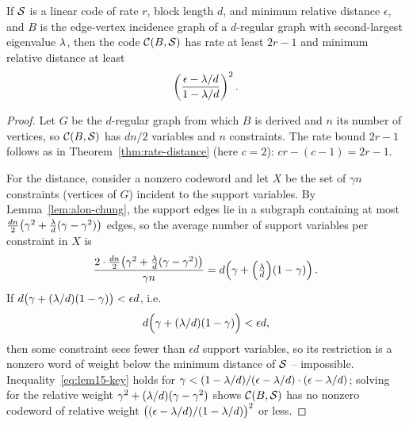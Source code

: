 \begin{lemma}
  \label{lem:distance-eigenvalue}
  If $\mathcal{S}$ is a linear code of rate $r$, block length $d$, and minimum relative
  distance $\epsilon$, and $B$ is the edge-vertex incidence graph of a
  $d$-regular graph with second-largest eigenvalue $\lambda$, then the code
  $\mathcal{C}(B,\mathcal{S})$ has rate at least $2r-1$ and minimum relative distance at least
  \[
    \left(\frac{\epsilon-\lambda/d}{1-\lambda/d}\right)^2.
  \]
\end{lemma}
\begin{proof}
  Let $G$ be the $d$-regular graph from which $B$ is derived and $n$ its number
  of vertices, so $\mathcal{C}(B,\mathcal{S})$ has $dn/2$ variables and $n$ constraints. The
  rate bound $2r-1$ follows as in Theorem~\ref{thm:rate-distance} (here $c=2$):
  $cr-(c-1)=2r-1$.

  For the distance, consider a nonzero codeword and let $X$ be the set of
  $\gamma n$ constraints (vertices of $G$) incident to the support variables. By
  Lemma~\ref{lem:alon-chung}, the support edges lie in a subgraph containing at
  most $\tfrac{dn}{2}\bigl(\gamma^2 + \tfrac{\lambda}{d}(\gamma-\gamma^2)\bigr)$
  edges, so the average number of support variables per constraint in $X$ is
  \[
    \frac{2\cdot\frac{dn}{2}\bigl(\gamma^2+\frac{\lambda}{d}(\gamma-\gamma^2)\bigr)}
         {\gamma n}
    = d\!\left(\gamma + \Bigl(\tfrac{\lambda}{d}\Bigr)(1-\gamma)\right).
  \]
  If $d\bigl(\gamma+(\lambda/d)(1-\gamma)\bigr) < \epsilon d$, i.e.
  \begin{equation}
    d\Bigl(\gamma + (\lambda/d)(1-\gamma)\Bigr) < \epsilon d,
    \label{eq:lem15-key}
  \end{equation}
  then some constraint sees fewer than $\epsilon d$ support variables, so its
  restriction is a nonzero word of weight below the minimum distance of $\mathcal{S}$ --
  impossible. Inequality~\eqref{eq:lem15-key} holds for
  $\gamma < (1-\lambda/d)/(\epsilon-\lambda/d)\cdot(\epsilon-\lambda/d)$; solving
  for the relative weight $\gamma^2+(\lambda/d)(\gamma-\gamma^2)$ shows
  $\mathcal{C}(B,\mathcal{S})$ has no nonzero codeword of relative weight
  $\bigl((\epsilon-\lambda/d)/(1-\lambda/d)\bigr)^2$ or less.
\end{proof}

